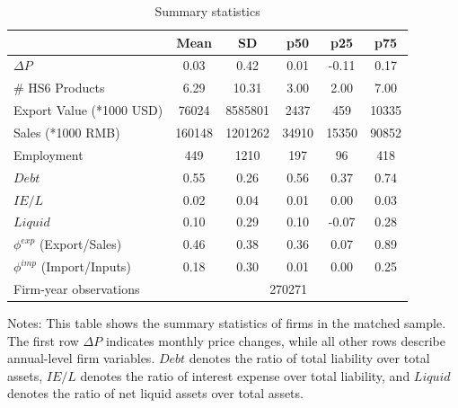 \begin{table}[htbp]
    \centering
    \caption{Summary statistics}
    \begin{threeparttable}
        \begin{tabular}{lccccc}
        \toprule
                &        Mean&          SD&         p50&         p25&         p75\\
        \midrule
        $\Delta P$        &        0.03&        0.42&        0.01&       -0.11&        0.17\\
        \# HS6 Products           &    6.29&       10.31&        3.00&        2.00&        7.00\\
        Export Value (*1000 USD)    &   76024&  8585801&     2437&      459&    10335\\
        Sales (*1000 RMB)   &   160148&  1201262&    34910&    15350&    90852\\
        Employment     &      449&     1210&      197&       96&      418\\
        $Debt$              &        0.55&        0.26&        0.56&        0.37&        0.74\\
        $IE/L$               &        0.02&        0.04&        0.01&        0.00&        0.03\\
        $Liquid$       &        0.10 &        0.29 &        0.10 &       -0.07 &        0.28\\
        $\phi^{exp}$ (Export/Sales)         &        0.46&        0.38&        0.36&        0.07&        0.89\\
        $\phi^{imp}$ (Import/Inputs)               &        0.18&        0.30&        0.01&        0.00&        0.25\\
        \midrule
        Firm-year observations        &     \multicolumn{5}{c}{270271}      \\
        \bottomrule
        \end{tabular}
        \begin{tablenotes}
    	\footnotesize
            \item Notes: This table shows the summary statistics of firms in the matched sample. The first row $\Delta P$ indicates monthly price changes, while all other rows describe annual-level firm variables. $Debt$ denotes the ratio of total liability over total assets, $IE/L$ denotes the ratio of interest expense over total liability, and $Liquid$ denotes the ratio of net liquid assets over total assets.
        \end{tablenotes}
    \end{threeparttable}
    \label{tab.summary}
\end{table}

